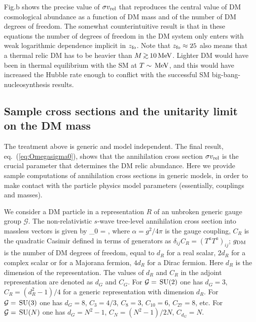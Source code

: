 Fig.b shows the precise value of $\sigma v_{\rm rel}$
 that reproduces the central value of DM cosmological abundance as a function of DM mass and of the number of DM  degrees of freedom.
 The somewhat counterintuitive result is that in these equations the number of degrees of freedom in the DM system only enters
with weak logarithmic dependence implicit in $z_{\rm fo}$. 
Note that $z_{\rm fo}\approx 25$ also means that a thermal relic DM has to be heavier than $M \circa{>} 10\MeV$. Lighter DM would have been in thermal equilibrium with the SM at $T \sim \,{\rm MeV}$, and this  would have increased the Hubble rate enough to conflict with the successful SM big-bang-nucleosynthesis results.





\subsection{Sample cross sections and the unitarity limit on the DM mass}\label{unitarity}
The treatment above is generic and model independent. The final result, eq.~(\ref{eq:Omegasigma0}), shows that the annihilation cross section
$\sigma v_{\rm rel}$ is the crucial parameter that determines the DM relic abundance.
Here we provide sample computations of annihilation cross sections in generic models, in order to make contact with the particle physics model parameters (essentially, couplings and masses).

\medskip

We consider a DM particle in a representation $R$ of an unbroken generic gauge group $\mathcal{G}$.
The non-relativistic
$s$-wave tree-level annihilation cross section into massless vectors is given by
\beq \label{eq:sigmavgeneric}
\sigma_0  = 
,
\eeq
where $\alpha=g^2/4\pi$ is the gauge coupling,
$C_R$ is the quadratic Casimir defined in terms of generators as $\delta_{ij} C_R =(T^aT^a)_{ij}$;
$g_{\rm DM}$ is the number of DM degrees of freedom,
equal to $d_R$ for a real scalar, $2d_R$ for a complex scalar or for a Majorana fermion,
$4d_R$ for a Dirac fermion.
Here $d_R$ is the dimension of the representation.
The values of $d_R$ and $C_R$ in the adjoint representation are denoted as $d_G$ and $C_G$.
For $\mathcal{G}=\,{\rm SU}(2)$ one has $d_G=3$, $C_R = (d_R^2-1)/4$ for a generic representation with dimension $d_R$.
For $\mathcal{G}=\,{\rm SU}(3)$ one has $d_G=8$,
$C_3=4/3$, $C_8=3$, $C_{10}=6$, $C_{27}=8$, etc.
For $\mathcal{G}=\,{\rm SU}(N)$ one has $d_G=N^2-1$, $C_N = (N^2-1)/2N$, $C_{d_G}=N$.

